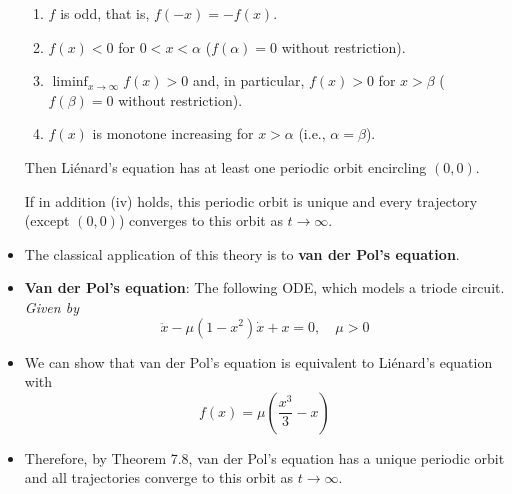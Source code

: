 \documentclass[../notes.tex]{subfiles}
\begin{document}
\begin{itemize}
\begin{enumerate}[label={(\roman*)}]
        \item $f$ is odd, that is, $f(-x)=-f(x)$.
        \item $f(x)<0$ for $0<x<\alpha$ ($f(\alpha)=0$ without restriction).
        \item $\liminf_{x\to\infty}f(x)>0$ and, in particular, $f(x)>0$ for $x>\beta$ ($f(\beta)=0$ without restriction).
        \item $f(x)$ is monotone increasing for $x>\alpha$ (i.e., $\alpha=\beta$).
    \end{enumerate}
    Then Li\'{e}nard's equation has at least one periodic orbit encircling $(0,0)$.\par
    If in addition (iv) holds, this periodic orbit is unique and every trajectory (except $(0,0)$) converges to this orbit as $t\to\infty$.
    \item The classical application of this theory is to \textbf{van der Pol's equation}.
    \item \textbf{Van der Pol's equation}: The following ODE, which models a triode circuit. \emph{Given by}
    \begin{equation*}
        \ddot{x}-\mu(1-x^2)\dot{x}+x = 0
        ,\quad
        \mu > 0
    \end{equation*}
    \item We can show that van der Pol's equation is equivalent to Li\'{e}nard's equation with
    \begin{equation*}
        f(x) = \mu\left( \frac{x^3}{3}-x \right)
    \end{equation*}
    \item Therefore, by Theorem 7.8, van der Pol's equation has a unique periodic orbit and all trajectories converge to this orbit as $t\to\infty$.
\end{itemize}
\end{document}

